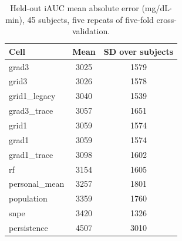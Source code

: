 \begin{table}[t]
\centering\small
\begin{tabular}{lcc}
\toprule
Cell & Mean & SD over subjects \\
\midrule
grad3 & 3025 & 1579 \\
grid3 & 3026 & 1578 \\
grid1\_legacy & 3040 & 1539 \\
grad3\_trace & 3057 & 1651 \\
grid1 & 3059 & 1574 \\
grad1 & 3059 & 1574 \\
grad1\_trace & 3098 & 1602 \\
rf & 3154 & 1605 \\
personal\_mean & 3257 & 1801 \\
population & 3359 & 1760 \\
snpe & 3420 & 1326 \\
persistence & 4507 & 3010 \\
\bottomrule
\end{tabular}
\caption{Held-out iAUC mean absolute error (mg/dL$\cdot$min), 45 subjects, five repeats of five-fold cross-validation.}
\label{tab:prediction}
\end{table}
